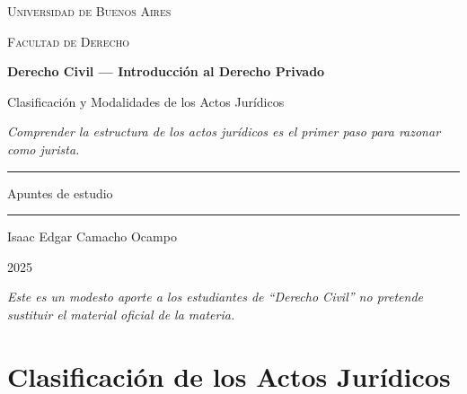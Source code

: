 \documentclass[12pt,oneside]{book}
\newcommand{\universidad}{Universidad de Buenos Aires}
\newcommand{\facultad}{Facultad de Derecho}
\newcommand{\materia}{Derecho Civil --- Introducción al Derecho Privado}
\newcommand{\titulo}{Clasificación y Modalidades de los Actos Jurídicos}
\newcommand{\autor}{Isaac Edgar Camacho Ocampo}
\newcommand{\anio}{2025}
\begin{document}
\begin{titlepage}
\thispagestyle{empty}

\begin{center}

\vspace*{1cm}

{\large \textsc{\universidad}}

\vspace{0.2cm}

{\large \textsc{\facultad}}

\vspace{3cm}

{\Huge \textbf{\materia}}

\vspace{1cm}

{\LARGE \titulo}

\vspace{0.8cm}

\textit{Comprender la estructura de los actos jurídicos es el primer paso para razonar como jurista.}

\vspace{1.2cm}

\rule{0.70\textwidth}{0.5pt}

\vspace{0.5cm}

{\large Apuntes de estudio}

\vspace{0.5cm}

\rule{0.70\textwidth}{0.5pt}

\vfill

{\large \autor}

\vspace{0.3cm}

{\large \anio}

\end{center}

\vfill

\begin{flushleft}
\textit{Este es un modesto aporte a los estudiantes de ``Derecho Civil'' no pretende sustituir el material oficial de la materia.}
\end{flushleft}

\end{titlepage}

\tableofcontents

\chapter{Clasificación de los Actos Jurídicos}
\end{document}
